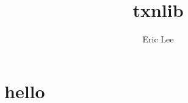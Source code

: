 \documentclass{article}
\author{Eric Lee}
\title{txnlib}
\begin{document}
\maketitle
\newpage{}

\section{hello}
\end{document}
